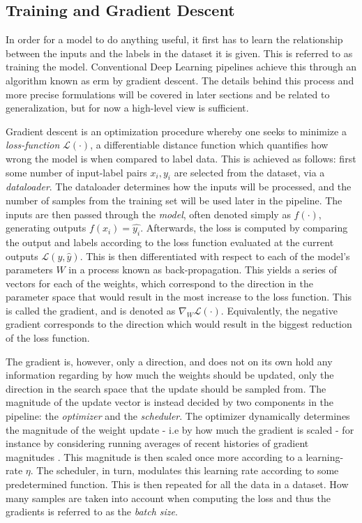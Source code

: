     \subsection{Training and Gradient Descent}
        In order for a model to do anything useful, it first has to learn the relationship between the inputs and the labels in the dataset it is given. This is referred to as training the model. Conventional Deep Learning pipelines achieve this through an algorithm known as \gls{erm} by gradient descent. The details behind this process and more precise formulations will be covered in later sections and be related to generalization, but for now a high-level view is sufficient. 
        
        Gradient descent is an optimization procedure whereby one seeks to minimize a \textit{loss-function} \(\mathcal{L}(\cdot)\), a differentiable distance function which quantifies how wrong the model is when compared to label data. This is achieved as follows: first some number of input-label pairs \({x_i,y_i}\) are selected from the dataset, via a \textit{dataloader}. The dataloader determines how the inputs will be processed, and the number of samples from the training set will be used later in the pipeline. The inputs are then passed through the \textit{model}, often denoted simply as \(f(\cdot)\), generating outputs \(f(x_i)=\hat{y_i}\). Afterwards, the loss is computed by comparing the output and labels according to the loss function evaluated at the current outputs \(\mathcal{L}(y, \hat{y})\). This is then differentiated with respect to each of the model's parameters \(W\) in a process known as back-propagation. This yields a series of vectors for each of the weights, which correspond to the direction in the parameter space that would result in the most increase to the loss function. This is called the gradient, and is denoted as \(\nabla_{W} \mathcal{L}(\cdot)\). Equivalently, the negative gradient corresponds to the direction which would result in the biggest reduction of the loss function.
        
        The gradient is, however, only a direction, and does not on its own hold any information regarding by how much the weights should be updated, only the direction in the search space that the update should be sampled from. The magnitude of the update vector is instead decided by two components in the pipeline: the \textit{optimizer} and the \textit{scheduler}. The optimizer dynamically determines the magnitude of the weight update - i.e by how much the gradient is scaled - for instance by considering running averages of recent histories of gradient magnitudes \cite{adam}. This magnitude is then scaled once more according to a learning-rate \(\eta\). The scheduler, in turn, modulates this learning rate according to some predetermined function. This is then repeated for all the data in a dataset. How many samples are taken into account when computing the loss and thus the gradients is referred to as the \textit{batch size}.
    

